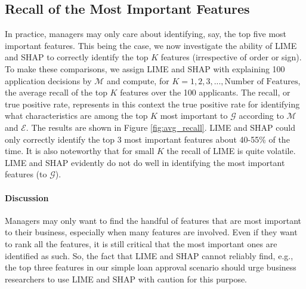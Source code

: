 \documentclass[12pt]{article}    %
\begin{document}
    \subsection*{Recall of the Most Important Features}
        \label{sec:recall}
        In practice, managers may only care about identifying, say, the top five most important features. This being the case, we now investigate the ability of LIME and SHAP to correctly identify the top $K$ features (irrespective of order or sign). To make these comparisons, we assign LIME and SHAP with explaining 100 application decisions by $\mathcal{M}$ and compute, for $K=1,2,3,...,\text{Number of Features}$, the average recall of the top $K$ features over the 100 applicants. The recall, or true positive rate, represents in this context the true positive rate for identifying what characteristics are among the top $K$ most important to $\mathcal{G}$ according to $\mathcal{M}$ and $\mathcal{E}$. The results are shown in Figure \ref{fig:avg_recall}.  LIME and SHAP could only correctly identify the top 3 most important features about 40-55\% of the time. It is also noteworthy that for small $K$ the recall of LIME is quite volatile. LIME and SHAP evidently do not do well in identifying the most important features (to $\mathcal{G}$). %

    
    \paragraph{Discussion} 
        Managers may only want to find the handful of features that are most important to their business, especially when many features are involved. Even if they want to rank all the features, it is still critical that the most important ones are identified as such. So, the fact that LIME and SHAP cannot reliably find, e.g., the top three features in our simple loan approval scenario should urge business researchers to use LIME and SHAP with caution for this purpose.%
\end{document}
